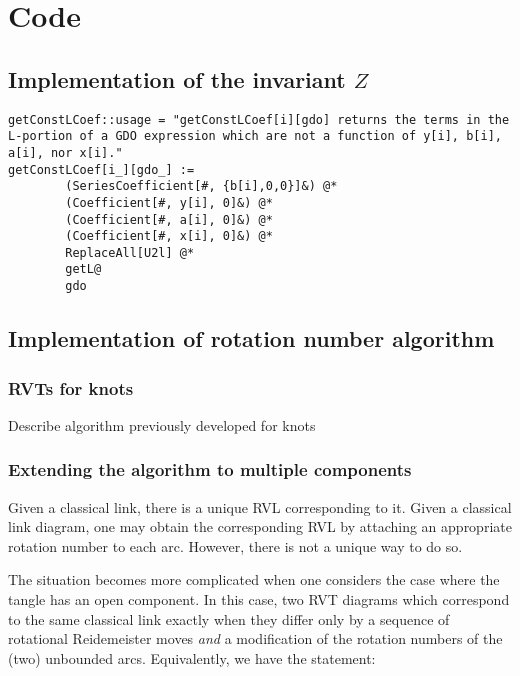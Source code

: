 \chapter{Code}
\section{Implementation of the invariant $Z$}


\begin{verbatim}
getConstLCoef::usage = "getConstLCoef[i][gdo] returns the terms in the L-portion of a GDO expression which are not a function of y[i], b[i], a[i], nor x[i]."
getConstLCoef[i_][gdo_] :=
        (SeriesCoefficient[#, {b[i],0,0}]&) @*
        (Coefficient[#, y[i], 0]&) @*
        (Coefficient[#, a[i], 0]&) @*
        (Coefficient[#, x[i], 0]&) @*
        ReplaceAll[U2l] @*
        getL@
        gdo
\end{verbatim}

\section{Implementation of rotation number algorithm}


\subsection{\acp{RVT} for knots}
Describe algorithm previously developed for knots

\subsection{Extending the algorithm to multiple components}

Given a classical link, there is a unique \ac{RVL} corresponding to it. Given a
classical link diagram, one may obtain the corresponding \ac{RVL} by attaching
an appropriate rotation number to each arc. However, there is not a unique way
to do so.

The situation becomes more complicated when one considers the case where the
tangle has an open component. In this case, two \ac{RVT} diagrams which
correspond to the same classical link exactly when they differ only by a
sequence of rotational Reidemeister moves \emph{and} a modification of the
rotation numbers of the (two) unbounded arcs. Equivalently, we have the
statement:

